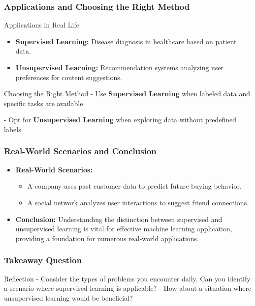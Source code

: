 \documentclass[aspectratio=169]{beamer}
\begin{document}
\begin{frame}[fragile]
    \frametitle{Applications and Choosing the Right Method}
    \begin{block}{Applications in Real Life}
        \begin{itemize}
            \item \textbf{Supervised Learning:} Disease diagnosis in healthcare based on patient data.
            \item \textbf{Unsupervised Learning:} Recommendation systems analyzing user preferences for content suggestions.
        \end{itemize}
    \end{block}
    
    \begin{block}{Choosing the Right Method}
        - Use \textbf{Supervised Learning} when labeled data and specific tasks are available.
        
        - Opt for \textbf{Unsupervised Learning} when exploring data without predefined labels.
    \end{block}
\end{frame}

\begin{frame}[fragile]
    \frametitle{Real-World Scenarios and Conclusion}
    \begin{itemize}
        \item \textbf{Real-World Scenarios:}
        \begin{itemize}
            \item A company uses past customer data to predict future buying behavior.
            \item A social network analyzes user interactions to suggest friend connections.
        \end{itemize}
        
        \item \textbf{Conclusion:}
        Understanding the distinction between supervised and unsupervised learning is vital for effective machine learning application, providing a foundation for numerous real-world applications.
    \end{itemize}
\end{frame}

\begin{frame}[fragile]
    \frametitle{Takeaway Question}
    \begin{block}{Reflection}
        - Consider the types of problems you encounter daily. Can you identify a scenario where supervised learning is applicable? 
        - How about a situation where unsupervised learning would be beneficial?
    \end{block}
\end{frame}
\end{document}
